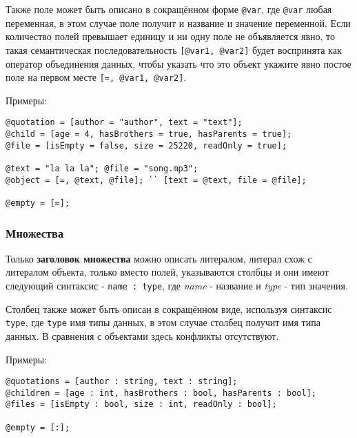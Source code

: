 Также поле может быть описано в сокращённом форме \lstinline|@var|, где \lstinline|@var| любая переменная, в этом случае поле получит и название и значение переменной. Если количество полей превышает единицу и ни одну поле не объявляется явно, то такая семантическая последовательность \lstinline|[@var1, @var2]| будет воспринята как оператор объединения данных, чтобы указать что это объект укажите явно постое поле на первом месте \lstinline|[=, @var1, @var2]|.

\noindent Примеры:
\begin{lstlisting}[numbers=none]
@quotation = [author = "author", text = "text"];
@child = [age = 4, hasBrothers = true, hasParents = true];
@file = [isEmpty = false, size = 25220, readOnly = true];

@text = "la la la"; @file = "song.mp3";
@object = [=, @text, @file]; `` [text = @text, file = @file];

@empty = [=];
\end{lstlisting}

\subsubsection{Множества}

Только {\bf заголовок множества} можно описать литералом, литерал схож с литералом объекта, только вместо полей, указываются столбцы и они имеют следующий синтаксис - \lstinline|name : type|, где  {\it name} - название и {\it type} - тип значения.

Столбец также может быть описан в сокращённом виде, используя синтаксис \lstinline|type|, где \lstinline|type| имя типы данных, в этом случае столбец получит имя типа данных. В сравнения с объектами здесь конфликты отсутствуют.

\noindent Примеры:
\begin{lstlisting}[numbers=none]
@quotations = [author : string, text : string];
@children = [age : int, hasBrothers : bool, hasParents : bool];
@files = [isEmpty : bool, size : int, readOnly : bool];

@empty = [:];
\end{lstlisting}

